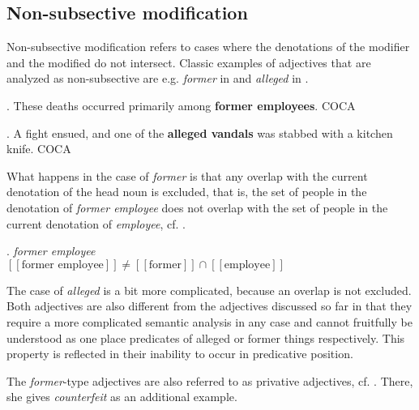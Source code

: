 \subsection{Non-subsective modification}
\label{sec:nonintersective_adjectives}

Non-subsective modification refers to cases where the denotations of
the modifier and the modified do not intersect. %
Classic examples of adjectives that are analyzed as non-subsective are e.g. \emph{former} in
\Next and \emph{alleged} in \NNext.

\ex. \label{ex:former_employees}
These deaths occurred primarily among \textbf{former employees}. COCA 


\ex. \label{ex:alleged_vandals}
 A fight ensued, and one of the \textbf{alleged vandals} was stabbed with
a kitchen knife. COCA

\pagebreak[4]
What happens in the case of \emph{former} is that any overlap with the current
denotation of the head noun is excluded, that is, the set of people in
the denotation of \emph{former employee} does not overlap with the set
of people in the current denotation of \emph{employee}, cf. \Next. 

\ex. \emph{former employee}\\
$[\![\mbox{former employee}]\!] \neq [\![\mbox{former}]\!]\cap [\![\mbox{employee}]\!]$

The case of \emph{alleged} is a bit more complicated, because an
overlap is not excluded. 
Both adjectives are also different from the adjectives discussed so
far in that they require a more complicated semantic analysis in any
case and cannot fruitfully be understood as one place
predicates of alleged or former things respectively. This property is
reflected in their inability to occur in predicative position.

The \emph{former}-type adjectives are also referred to as privative
adjectives, cf. \citet[325]{Partee:1995}. There, she gives \emph{counterfeit}
as an additional example.

